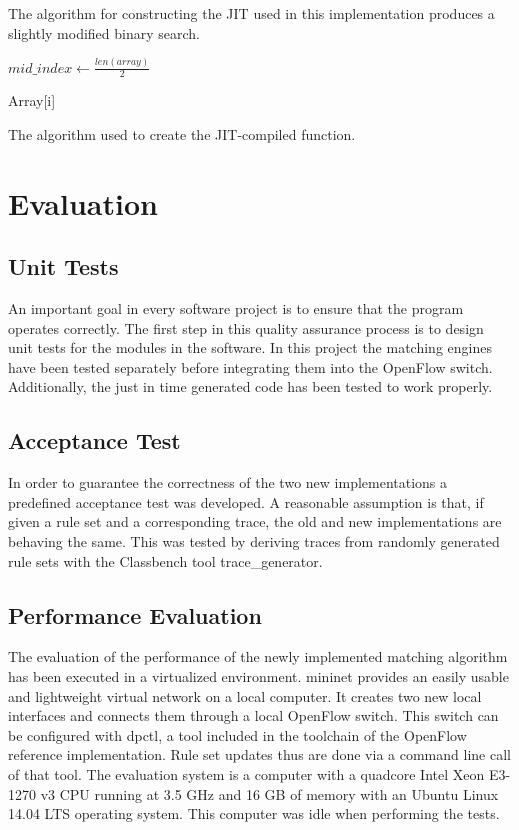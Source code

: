 \documentclass[a4paper,
		12pt,
		parskip=full,
		titlepage
		]{scrartcl}
\begin{document}
The algorithm for constructing the JIT used in this implementation produces a slightly modified binary search.
\begin{algorithm}
\begin{algorithmic}

    \State $mid\_index\gets \frac{len(array)}{2}$
    
    \Return Array[i]
\EndFunction
\end{algorithmic}
\caption{The algorithm used to create the JIT-compiled function.}
\label{alg:jit}
\end{algorithm}

\section{Evaluation}
\subsection{Unit Tests}
An important goal in every software project is to ensure that the program operates correctly.
The first step in this quality assurance process is to design unit tests for the modules in the software.
In this project the matching engines have been tested separately before integrating them into the OpenFlow switch.
Additionally, the just in time generated code has been tested to work properly.

\subsection{Acceptance Test}
In order to guarantee the correctness of the two new implementations a predefined acceptance test was developed.
A reasonable assumption is that, if given a rule set and a corresponding trace, the old and new implementations are behaving the same.
This was tested by deriving traces from randomly generated rule sets with the Classbench\cite{classbench_website} tool \textsf{trace\_generator}.

\subsection{Performance Evaluation}
The evaluation of the performance of the newly implemented matching algorithm has been executed in a virtualized environment.
\textsf{mininet}\cite{mininet} provides an easily usable and lightweight virtual network on a local computer.
It creates two new local interfaces and connects them through a local OpenFlow switch.
This switch can be configured with \textsf{dpctl}, a tool included in the toolchain of the OpenFlow reference implementation.
Rule set updates thus are done via a command line call of that tool.
The evaluation system is a computer with a quadcore Intel Xeon E3-1270 v3 CPU 
running at 3.5 GHz and 16 GB of memory with an Ubuntu Linux 14.04 LTS operating system.
This computer was idle when performing the tests.
\end{document}
